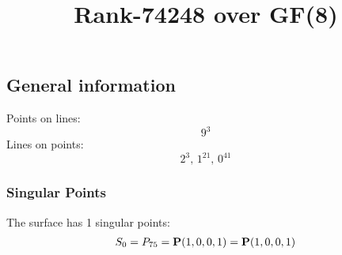 \documentclass{article}
\newcommand\setTBstruts{\def\T{\rule{0pt}{2.6ex}}%
\def\B{\rule[-1.2ex]{0pt}{0pt}}}
\newcommand{\bP}{{\bf P}}
\begin{document}
 
\setTBstruts



{\allowdisplaybreaks%






\title{Rank-74248 over GF(8)}
\author{}%
\maketitle%
%
{}



\subsection*{General information}
Points on lines:
$$
9^3$$
Lines on points:
$$
2^3,\,1^{21},\,0^{41}$$
\subsubsection*{Singular Points}
The surface has 1 singular points:\\
\begin{align*}
S_{0} &= P_{75}=\bP(1, 0, 0, 1) = \bP(1, 0, 0, 1)\\
\end{align*}
}
\end{document}
